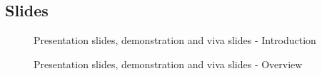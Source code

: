 \documentclass[a4paper]{article}
\begin{document}
\begin{appendices}
	\subsection{Slides}
	\begin{figure}[h!]
		\caption{Presentation slides, demonstration and viva slides - Introduction}
	\end{figure}
	\begin{figure}[h!]
		\caption{Presentation slides, demonstration and viva slides - Overview}
	\end{figure}
	\newpage
	\begin{figure}[h!]

\end{figure}
\end{appendices}
\end{document}
